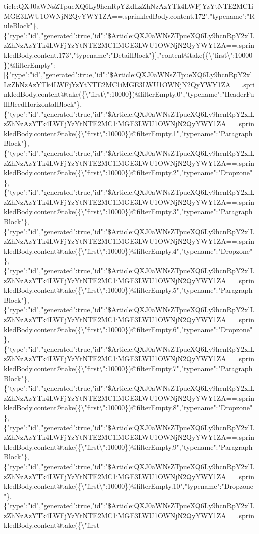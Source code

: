 ticle:QXJ0aWNsZTpueXQ6Ly9hcnRpY2xlLzZhNzAzYTk4LWFjYzYtNTE2MC1iMGE3LWU1OWNjN2QyYWY1ZA==.sprinkledBody.content.172","typename":"RuleBlock"\},\{"type":"id","generated":true,"id":"\$Article:QXJ0aWNsZTpueXQ6Ly9hcnRpY2xlLzZhNzAzYTk4LWFjYzYtNTE2MC1iMGE3LWU1OWNjN2QyYWY1ZA==.sprinkledBody.content.173","typename":"DetailBlock"\}{]},"content@take(\{\textbackslash{}"first\textbackslash{}":10000\})@filterEmpty":{[}\{"type":"id","generated":true,"id":"\$Article:QXJ0aWNsZTpueXQ6Ly9hcnRpY2xlLzZhNzAzYTk4LWFjYzYtNTE2MC1iMGE3LWU1OWNjN2QyYWY1ZA==.sprinkledBody.content@take(\{\textbackslash{}"first\textbackslash{}":10000\})@filterEmpty.0","typename":"HeaderFullBleedHorizontalBlock"\},\{"type":"id","generated":true,"id":"\$Article:QXJ0aWNsZTpueXQ6Ly9hcnRpY2xlLzZhNzAzYTk4LWFjYzYtNTE2MC1iMGE3LWU1OWNjN2QyYWY1ZA==.sprinkledBody.content@take(\{\textbackslash{}"first\textbackslash{}":10000\})@filterEmpty.1","typename":"ParagraphBlock"\},\{"type":"id","generated":true,"id":"\$Article:QXJ0aWNsZTpueXQ6Ly9hcnRpY2xlLzZhNzAzYTk4LWFjYzYtNTE2MC1iMGE3LWU1OWNjN2QyYWY1ZA==.sprinkledBody.content@take(\{\textbackslash{}"first\textbackslash{}":10000\})@filterEmpty.2","typename":"Dropzone"\},\{"type":"id","generated":true,"id":"\$Article:QXJ0aWNsZTpueXQ6Ly9hcnRpY2xlLzZhNzAzYTk4LWFjYzYtNTE2MC1iMGE3LWU1OWNjN2QyYWY1ZA==.sprinkledBody.content@take(\{\textbackslash{}"first\textbackslash{}":10000\})@filterEmpty.3","typename":"ParagraphBlock"\},\{"type":"id","generated":true,"id":"\$Article:QXJ0aWNsZTpueXQ6Ly9hcnRpY2xlLzZhNzAzYTk4LWFjYzYtNTE2MC1iMGE3LWU1OWNjN2QyYWY1ZA==.sprinkledBody.content@take(\{\textbackslash{}"first\textbackslash{}":10000\})@filterEmpty.4","typename":"Dropzone"\},\{"type":"id","generated":true,"id":"\$Article:QXJ0aWNsZTpueXQ6Ly9hcnRpY2xlLzZhNzAzYTk4LWFjYzYtNTE2MC1iMGE3LWU1OWNjN2QyYWY1ZA==.sprinkledBody.content@take(\{\textbackslash{}"first\textbackslash{}":10000\})@filterEmpty.5","typename":"ParagraphBlock"\},\{"type":"id","generated":true,"id":"\$Article:QXJ0aWNsZTpueXQ6Ly9hcnRpY2xlLzZhNzAzYTk4LWFjYzYtNTE2MC1iMGE3LWU1OWNjN2QyYWY1ZA==.sprinkledBody.content@take(\{\textbackslash{}"first\textbackslash{}":10000\})@filterEmpty.6","typename":"Dropzone"\},\{"type":"id","generated":true,"id":"\$Article:QXJ0aWNsZTpueXQ6Ly9hcnRpY2xlLzZhNzAzYTk4LWFjYzYtNTE2MC1iMGE3LWU1OWNjN2QyYWY1ZA==.sprinkledBody.content@take(\{\textbackslash{}"first\textbackslash{}":10000\})@filterEmpty.7","typename":"ParagraphBlock"\},\{"type":"id","generated":true,"id":"\$Article:QXJ0aWNsZTpueXQ6Ly9hcnRpY2xlLzZhNzAzYTk4LWFjYzYtNTE2MC1iMGE3LWU1OWNjN2QyYWY1ZA==.sprinkledBody.content@take(\{\textbackslash{}"first\textbackslash{}":10000\})@filterEmpty.8","typename":"Dropzone"\},\{"type":"id","generated":true,"id":"\$Article:QXJ0aWNsZTpueXQ6Ly9hcnRpY2xlLzZhNzAzYTk4LWFjYzYtNTE2MC1iMGE3LWU1OWNjN2QyYWY1ZA==.sprinkledBody.content@take(\{\textbackslash{}"first\textbackslash{}":10000\})@filterEmpty.9","typename":"ParagraphBlock"\},\{"type":"id","generated":true,"id":"\$Article:QXJ0aWNsZTpueXQ6Ly9hcnRpY2xlLzZhNzAzYTk4LWFjYzYtNTE2MC1iMGE3LWU1OWNjN2QyYWY1ZA==.sprinkledBody.content@take(\{\textbackslash{}"first\textbackslash{}":10000\})@filterEmpty.10","typename":"Dropzone"\},\{"type":"id","generated":true,"id":"\$Article:QXJ0aWNsZTpueXQ6Ly9hcnRpY2xlLzZhNzAzYTk4LWFjYzYtNTE2MC1iMGE3LWU1OWNjN2QyYWY1ZA==.sprinkledBody.content@take(\{\textbackslash{}"first\tex